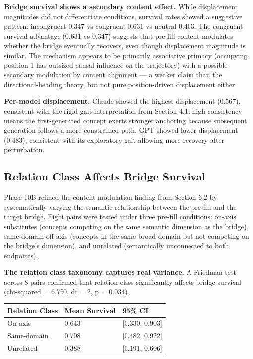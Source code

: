 \textbf{Bridge survival shows a secondary content effect.} While displacement magnitudes did not differentiate conditions, survival rates showed a suggestive pattern: incongruent 0.347 vs congruent 0.631 vs neutral 0.403. The congruent survival advantage (0.631 vs 0.347) suggests that pre-fill content modulates whether the bridge eventually recovers, even though displacement magnitude is similar. The mechanism appears to be primarily associative primacy (occupying position 1 has outsized causal influence on the trajectory) with a possible secondary modulation by content alignment --- a weaker claim than the directional-heading theory, but not pure position-driven displacement either.

\textbf{Per-model displacement.} Claude showed the highest displacement (0.567), consistent with the rigid-gait interpretation from Section 4.1: high consistency means the first-generated concept exerts stronger anchoring because subsequent generation follows a more constrained path. GPT showed lower displacement (0.483), consistent with its exploratory gait allowing more recovery after perturbation.

\subsection{Relation Class Affects Bridge Survival}\label{relation-class-affects-bridge-survival}

Phase 10B refined the content-modulation finding from Section 6.2 by systematically varying the semantic relationship between the pre-fill and the target bridge. Eight pairs were tested under three pre-fill conditions: on-axis substitutes (concepts competing on the same semantic dimension as the bridge), same-domain off-axis (concepts in the same broad domain but not competing on the bridge's dimension), and unrelated (semantically unconnected to both endpoints).

\textbf{The relation class taxonomy captures real variance.} A Friedman test across 8 pairs confirmed that relation class significantly affects bridge survival (chi-squared = 6.750, df = 2, p = 0.034).

\begin{longtable}[]{@{}lll@{}}
\toprule\noalign{}
Relation Class & Mean Survival & 95\% CI \\
\midrule\noalign{}
\endhead
\bottomrule\noalign{}
\endlastfoot
On-axis & 0.643 & {[}0.330, 0.903{]} \\
Same-domain & 0.708 & {[}0.482, 0.922{]} \\
Unrelated & 0.388 & {[}0.191, 0.606{]} \\
\end{longtable}

